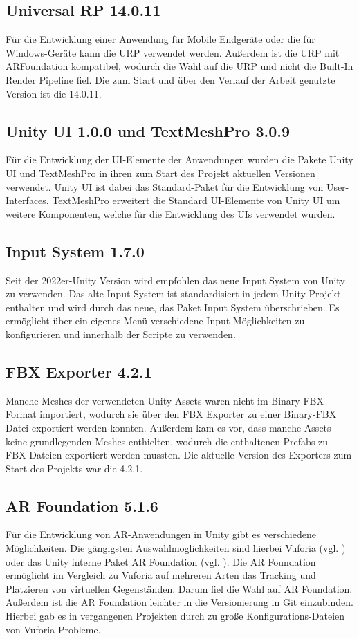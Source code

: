 \subsection{Universal RP 14.0.11}
Für die Entwicklung einer Anwendung für Mobile Endgeräte oder die für Windows-Geräte kann die \ac{URP} verwendet werden. Außerdem ist die \ac{URP} mit ARFoundation kompatibel, wodurch die Wahl auf die \ac{URP} und nicht die Built-In Render Pipeline fiel. Die zum Start und über den Verlauf der Arbeit genutzte Version ist die 14.0.11.

\subsection{Unity UI 1.0.0 und TextMeshPro 3.0.9}
Für die Entwicklung der \ac{UI}-Elemente der Anwendungen wurden die Pakete Unity \ac{UI} und TextMeshPro in ihren zum Start des Projekt aktuellen Versionen verwendet. Unity \ac{UI} ist dabei das Standard-Paket für die Entwicklung von User-Interfaces. TextMeshPro erweitert die Standard \ac{UI}-Elemente von Unity \ac{UI} um weitere Komponenten, welche für die Entwicklung des \ac{UI}s verwendet wurden.

\subsection{Input System 1.7.0}
Seit der 2022er-Unity Version wird empfohlen das neue Input System von Unity zu verwenden. Das alte Input System ist standardisiert in jedem Unity Projekt enthalten und wird durch das neue, das Paket Input System überschrieben. Es ermöglicht über ein eigenes Menü verschiedene Input-Möglichkeiten zu konfigurieren und innerhalb der Scripte zu verwenden.

\subsection{FBX Exporter 4.2.1}
Manche Meshes der verwendeten Unity-Assets waren nicht im Binary-\ac{FBX}-Format importiert,  wodurch sie über den \ac{FBX} Exporter zu einer Binary-\ac{FBX} Datei exportiert werden konnten. Außerdem kam es vor, dass manche Assets keine grundlegenden Meshes enthielten, wodurch die enthaltenen Prefabs zu \ac{FBX}-Dateien exportiert werden mussten. Die aktuelle Version des Exporters zum Start des Projekts war die 4.2.1.

\subsection{AR Foundation 5.1.6}
Für die Entwicklung von \ac{AR}-Anwendungen in Unity gibt es verschiedene Möglichkeiten. Die gängigsten Auswahlmöglichkeiten sind hierbei Vuforia (vgl. \cite{parametric_technology_gmbh_vuforia_nodate}) oder das Unity interne Paket AR Foundation (vgl. \cite{unity_technologies_ar_2024}). Die AR Foundation ermöglicht im Vergleich zu Vuforia auf mehreren Arten das Tracking und Platzieren von virtuellen Gegenständen. Darum fiel die Wahl auf AR Foundation. Außerdem ist die AR Foundation leichter in die Versionierung in Git einzubinden. Hierbei gab es in vergangenen Projekten durch zu große Konfigurations-Dateien von Vuforia Probleme.

